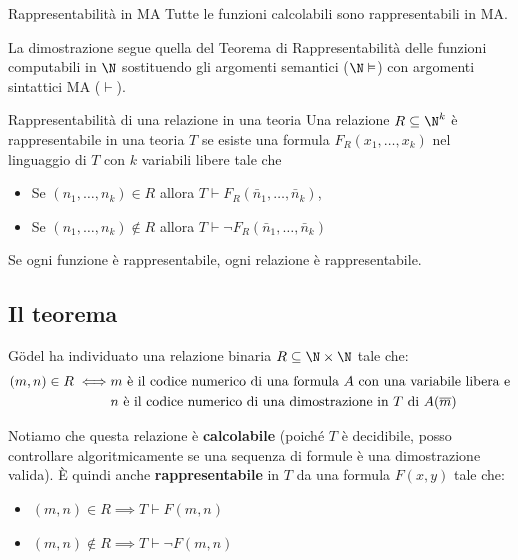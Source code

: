 \documentclass[a4paper,11pt]{report}
\begin{document}
\begin{thmframe}{Rappresentabilità in MA}{}
    Tutte le funzioni calcolabili sono rappresentabili in MA.
    \begin{proofframe}{}{}
        La dimostrazione segue quella del Teorema di Rappresentabilità delle funzioni computabili in \( \N \) sostituendo gli argomenti semantici (\( \N \vDash \)) con argomenti sintattici MA (\( \vdash\)).
    \end{proofframe}
\end{thmframe}


\begin{defframe}{Rappresentabilità di una relazione in una teoria}{}
Una relazione \( R \subseteq \N^k \) è rappresentabile in una teoria \( T \) se esiste una formula \( F_R(x_1, \dots, x_k) \) nel linguaggio di \( T \) con \( k \) variabili libere tale che
\begin{itemize}
    \item[(1)] Se \( (n_1, \dots, n_k) \in R \) allora \( T \vdash F_R(\bar{n}_1, \dots, \bar{n}_k) \),
    \item[(2)] Se \( (n_1, \dots, n_k) \notin R \) allora \( T \vdash \neg F_R(\bar{n}_1, \dots, \bar{n}_k) \)
\end{itemize}
\begin{gframe}{}
    Se ogni funzione è rappresentabile, ogni relazione è rappresentabile.
\end{gframe}
\end{defframe}

\subsection{Il teorema}
Gödel ha individuato una relazione binaria \( R \subseteq \N \times \N \) tale che:
\begin{align*}
    (m, n) \in R \iff & m \text{ è il codice numerico di una formula \( A \) con una variabile libera e}\\
                      & n \text{ è il codice numerico di una dimostrazione in \( T \) di \( A(\overline{m}) \) }
\end{align*}

Notiamo che questa relazione è \textbf{calcolabile} (poiché \( T \) è decidibile, posso controllare algoritmicamente se una sequenza di formule è una dimostrazione valida). È quindi anche \textbf{rappresentabile} in \( T \) da una formula \( F(x, y) \) tale che:
\begin{itemize}
    \item \( (m, n)\in R \implies T\vdash F(m, n) \)
    \item \( (m, n)\not\in R \implies T\vdash \neg F(m, n) \)
\end{itemize}
\end{document}

